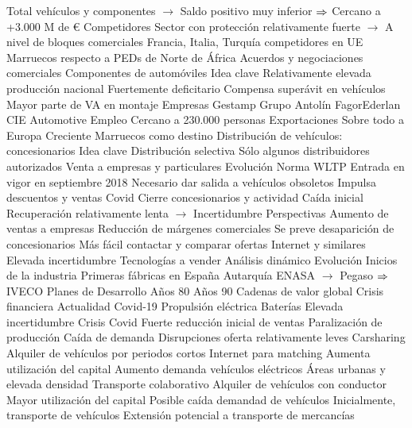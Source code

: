 \documentclass{nuevotema}
\begin{document}
\begin{esquemal}
				\4[] Total vehículos y componentes
				\4[] $\to$ Saldo positivo muy inferior
				\4[] $\Rightarrow$ Cercano a +3.000 M de €
				\4 Competidores
				\4[] Sector con protección relativamente fuerte
				\4[] $\to$ A nivel de bloques comerciales
				\4[] Francia, Italia, Turquía competidores en UE
				\4[] Marruecos respecto a PEDs de Norte de África
				\4 Acuerdos y negociaciones comerciales
		\2 Componentes de automóviles
			\3 Idea clave
				\4 Relativamente elevada producción nacional
				\4 Fuertemente deficitario
				\4[] Compensa superávit en vehículos
				\4[] Mayor parte de VA en montaje
			\3 Empresas
				\4 Gestamp
				\4 Grupo Antolín
				\4 FagorEderlan
				\4 CIE Automotive
			\3 Empleo
				\4 Cercano a 230.000 personas
			\3 Exportaciones
				\4 Sobre todo a Europa
				\4 Creciente Marruecos como destino
		\2 Distribución de vehículos: concesionarios
			\3 Idea clave
				\4 Distribución selectiva
				\4[] Sólo algunos distribuidores autorizados
				\4 Venta a empresas y particulares
			\3 Evolución
				\4 Norma WLTP
				\4[] Entrada en vigor en septiembre 2018
				\4 Necesario dar salida a vehículos obsoletos
				\4[] Impulsa descuentos y ventas
				\4 Covid
				\4[] Cierre concesionarios y actividad
				\4[] Caída inicial
				\4[] Recuperación relativamente lenta
				\4[] $\to$ Incertidumbre
			\3 Perspectivas
				\4 Aumento de ventas a empresas
				\4[] Reducción de márgenes comerciales
				\4 Se preve desaparición de concesionarios
				\4 Más fácil contactar y comparar ofertas
				\4[] Internet y similares
				\4 Elevada incertidumbre
				\4[] Tecnologías a vender
		\2 Análisis dinámico
			\3 Evolución
				\4 Inicios de la industria
				\4 Primeras fábricas en España
				\4 Autarquía
				\4[] ENASA
				\4[] $\to$ Pegaso
				\4[] $\Rightarrow$ IVECO
				\4 Planes de Desarrollo
				\4 Años 80
				\4 Años 90
				\4 Cadenas de valor global
				\4 Crisis financiera
			\3 Actualidad
				\4 Covid-19
				\4 Propulsión eléctrica
				\4 Baterías
			\3 Elevada incertidumbre
			\3 Crisis Covid
				\4 Fuerte reducción inicial de ventas
				\4 Paralización de producción
				\4[] Caída de demanda
				\4[] Disrupciones oferta relativamente leves
			\3 Carsharing
				\4 Alquiler de vehículos por periodos cortos
				\4 Internet para matching
				\4 Aumenta utilización del capital
				\4 Aumento demanda vehículos eléctricos
				\4 Áreas urbanas y elevada densidad
			\3 Transporte colaborativo
				\4 Alquiler de vehículos con conductor
				\4 Mayor utilización del capital
				\4 Posible caída demandad de vehículos
				\4 Inicialmente, transporte de vehículos
				\4 Extensión potencial a transporte de mercancías

\end{esquemal}
\end{document}
